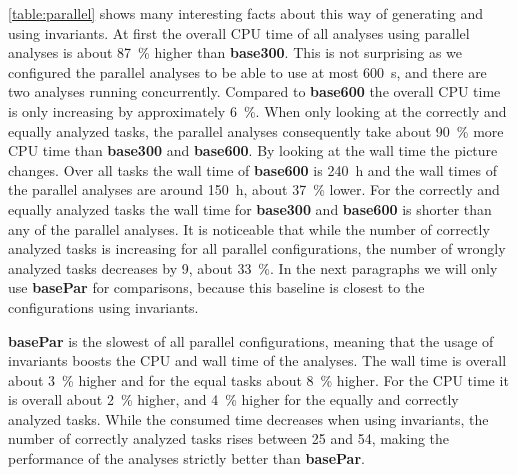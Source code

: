 \autoref{table:parallel} shows many interesting facts about this way of generating and using invariants. At first the overall CPU time of all analyses using parallel analyses is about \SI{87}{\percent} higher
than \textbf{base300}. This is not surprising as we configured the parallel analyses to be able to use at most \SI{600}{\second}, and there are two analyses running concurrently. Compared to \textbf{base600} the
overall CPU time is only increasing by approximately \SI{6}{\percent}. When only looking at the correctly and equally analyzed tasks, the parallel analyses consequently take about \SI{90}{\percent} more CPU time than
\textbf{base300} and \textbf{base600}.
By looking at the wall time the picture changes. Over all tasks the wall time of \textbf{base600} is \SI{240}{\hour} and the wall times of the parallel analyses are around \SI{150}{\hour}, about \SI{37}{\percent} lower. For the 
correctly and equally analyzed tasks the wall time for \textbf{base300} and \textbf{base600} is shorter than any of the parallel analyses. It is noticeable that while the number of correctly 
analyzed tasks is increasing for all parallel configurations, the number of wrongly analyzed tasks decreases by 9, about \SI{33}{\percent}. In the next paragraphs we will only use \textbf{basePar} for 
comparisons, because this baseline is closest to the configurations using invariants.

\textbf{basePar} is the slowest of all parallel configurations, meaning that the usage of invariants boosts the CPU and wall time of the analyses. The wall time is overall about \SI{3}{\percent} higher and for the 
equal tasks about \SI{8}{\percent} higher. For the CPU time it is overall about \SI{2}{\percent} higher, and \SI{4}{\percent} higher for the equally and correctly analyzed tasks.
While the consumed time decreases when using invariants, the number of 
correctly analyzed tasks rises between \num{25} and \num{54}, making the performance of the analyses strictly better than \textbf{basePar}.

